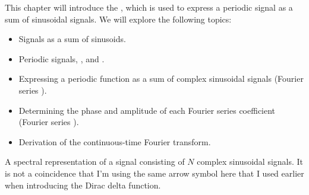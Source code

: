 This chapter will introduce the \emph{}, which is used to express a periodic signal as a sum of sinusoidal signals. We will explore the following topics:
\begin{itemize}
\item Signals as a sum of sinusoids.
\item Periodic signals, \emph{}, and \emph{}.
\item Expressing a periodic function as a sum of complex sinusoidal signals (Fourier series ).
\item Determining the phase and amplitude of each Fourier series coefficient (Fourier series ).
\item Derivation of the continuous-time Fourier transform.
\end{itemize}

\begin{marginfigure}
\begin{center}
\end{center}
\caption{A spectral representation of a signal consisting of $N$ complex sinusoidal signals. It is not a coincidence that I'm using the same arrow symbol here that I used earlier when introducing the Dirac delta function.}
\label{fig:spec_rep}
\end{marginfigure}

